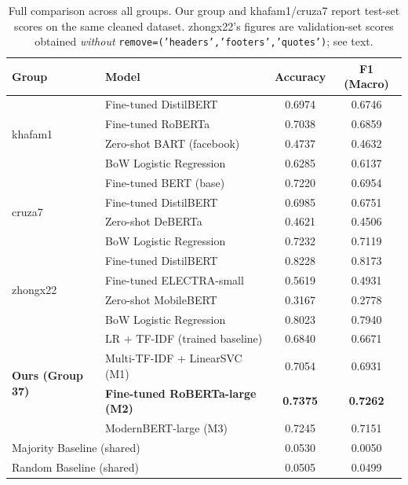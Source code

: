 \documentclass[11pt]{article}
\begin{document}
\begin{table}[t]
\centering
\small
\begin{tabular}{llcc}
\toprule
\textbf{Group} & \textbf{Model} & \textbf{Accuracy} & \textbf{F1 (Macro)} \\
\midrule
\multirow{4}{*}{khafam1}
  & Fine-tuned DistilBERT            & 0.6974 & 0.6746 \\
  & Fine-tuned RoBERTa               & 0.7038 & 0.6859 \\
  & Zero-shot BART (facebook)        & 0.4737 & 0.4632 \\
  & BoW Logistic Regression          & 0.6285 & 0.6137 \\
\midrule
\multirow{4}{*}{cruza7}
  & Fine-tuned BERT (base)           & 0.7220 & 0.6954 \\
  & Fine-tuned DistilBERT            & 0.6985 & 0.6751 \\
  & Zero-shot DeBERTa                & 0.4621 & 0.4506 \\
  & BoW Logistic Regression          & 0.7232 & 0.7119 \\
\midrule
\multirow{4}{*}{zhongx22}
  & Fine-tuned DistilBERT            & 0.8228 & 0.8173 \\
  & Fine-tuned ELECTRA-small         & 0.5619 & 0.4931 \\
  & Zero-shot MobileBERT             & 0.3167 & 0.2778 \\
  & BoW Logistic Regression          & 0.8023 & 0.7940 \\
\midrule
\multirow{4}{*}{\textbf{Ours (Group 37)}}
  & LR + TF-IDF (trained baseline)               & 0.6840 & 0.6671 \\
  & Multi-TF-IDF + LinearSVC (M1)                & 0.7054 & 0.6931 \\
  & \textbf{Fine-tuned RoBERTa-large (M2)}       & \textbf{0.7375} & \textbf{0.7262} \\
  & ModernBERT-large (M3)          & 0.7245 & 0.7151 \\
\midrule
\multicolumn{2}{l}{Majority Baseline (shared)} & 0.0530 & 0.0050 \\
\multicolumn{2}{l}{Random Baseline (shared)}   & 0.0505 & 0.0499 \\
\bottomrule
\end{tabular}
\caption{\label{tab:classmate-results}
  Full comparison across all groups.  Our group and khafam1/cruza7
  report test-set scores on the same cleaned dataset.  zhongx22's
  figures are validation-set scores obtained \emph{without}
  \texttt{remove=('headers','footers','quotes')}; see text.}
\end{table}
\end{document}
